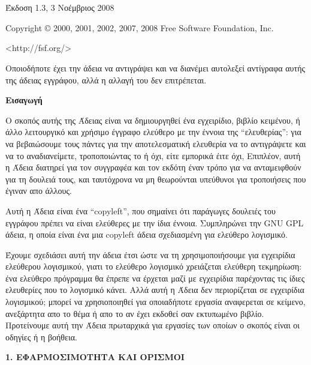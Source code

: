\section{}\label{label_fdl}
 \begin{center}

       Έκδοση 1.3, 3 Νοέμβριος 2008


 Copyright \copyright{} 2000, 2001, 2002, 2007, 2008  Free Software Foundation, Inc.
 
 \bigskip
 
     <http://fsf.org/>
  
 \bigskip
 
 Οποιοδήποτε έχει την άδεια να αντιγράψει και να διανέμει αυτολεξεί αντίγραφα αυτής της άδειας εγγράφου, αλλά η αλλαγή του δεν επιτρέπεται.
\end{center}


\begin{center}
{\bf\large Εισαγωγή}
\end{center}

Ο σκοπός αυτής της Άδειας είναι να δημιουργηθεί ένα εγχειρίδιο, βιβλίο κειμένου, ή άλλο λειτουργικό και χρήσιμο έγγραφο ελεύθερο με την έννοια της “ελευθερίας”: για να βεβαιώσουμε τους πάντες για την αποτελεσματική ελευθερία να το αντιγράψετε και να το αναδιανείμετε, τροποποιώντας το ή όχι, είτε εμπορικά έιτε όχι, Επιπλέον, αυτή η Άδεια διατηρεί για τον συγγραφέα και τον εκδότη έναν τρόπο για να ανταμειφθούν για τη δουλειά τους, και ταυτόχρονα να μη θεωρούνται υπεύθυνοι για τροποιήσεις που έγιναν απο άλλους.

Αυτή η Άδεια είναι ένα “copyleft”, που σημαίνει ότι παράγωγες δουλειές του εγγράφου πρέπει να είναι ελεύθερες με την ίδια έννοια. Συμπληρώνει την GNU GPL άδεια, η οποία είναι ένα μια copyleft άδεια σχεδιασμένη για ελεύθερο λογισμικό.

Έχουμε σχεδιάσει αυτή την άδεια έτσι ώστε να τη χρησιμοποιήσουμε για εγχειρίδια ελεύθερου λογισμικού, γιατι το ελεύθερο λογισμικό χρειάζεται ελεύθερη τεκμηρίωση: ένα ελεύθερο πρόγραμμα θα έπρεπε να έρχεται μαζί με εγχειρίδια παρέχοντας τις ίδιες ελευθερίες που το λογισμικό κάνει. Αλλά αυτή η Άδεια δεν περιορίζεται σε εγχειρίδια λογισμικού; μπορεί να χρησιοποιηθεί για οποιαδήποτε εργασία αναφερεται σε κείμενο, ανεξάρτητα απο το θέμα ή απο το αν έχει εκδοθεί σαν εκτυπωμένο βιβλίο. Προτείνουμε αυτή την Άδεια πρωταρχικά για εργασίες των οποίων ο σκοπός είναι οι οδηγίες ή η βοήθεια.


\begin{center}
{\Large\bf 1. ΕΦΑΡΜΟΣΙΜΟΤΗΤΑ ΚΑΙ ΟΡΙΣΜΟΙ\par}
\end{center}

